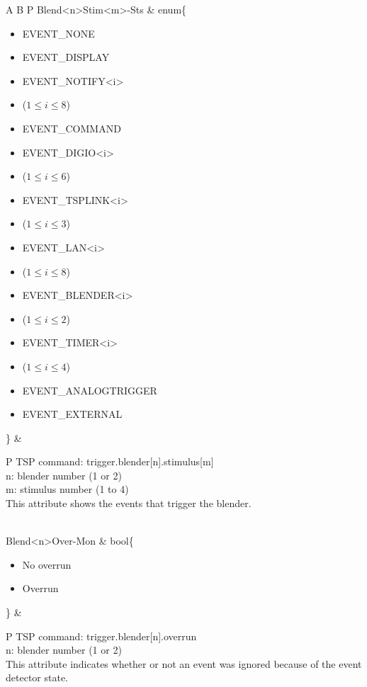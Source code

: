 \documentclass[openany]{article}
\begin{document}
\begin{longtable}{A B P}
		Blend{\textless n\textgreater}Stim{\textless m\textgreater}-Sts & enum\{\begin{itemize}[noitemsep]
					\small
					\item[] EVENT\_NONE
					\item[] EVENT\_DISPLAY
					\item[] EVENT\_NOTIFY\textless i\textgreater
					\item[] ($1\leq i\leq 8$)
					\item[] EVENT\_COMMAND
					\item[] EVENT\_DIGIO\textless i\textgreater
					\item[] ($1\leq i\leq 6$)
					\item[] EVENT\_TSPLINK\textless i\textgreater
					\item[] ($1\leq i\leq 3$)
					\item[] EVENT\_LAN\textless i\textgreater
					\item[] ($1\leq i\leq 8$)
					\item[] EVENT\_BLENDER\textless i\textgreater 
					\item[] ($1\leq i\leq 2$)
					\item[] EVENT\_TIMER\textless i\textgreater
					\item[] ($1\leq i\leq 4$)
					\item[] EVENT\_ANALOGTRIGGER
					\item[] EVENT\_EXTERNAL
				\end{itemize}\} & 
				\begin{tabular}{P}
					TSP command: trigger.blender[n].stimulus[m] \\
					n: blender number (1 or 2) \\
					m: stimulus number (1 to 4) \\
					This attribute shows the events that trigger the blender.
				\end{tabular} \\ \hline
		Blend{\textless n\textgreater}Over-Mon & bool\{\begin{itemize}[noitemsep]
					\small
					\item[] No overrun
					\item[] Overrun
				\end{itemize}\} & 
				\begin{tabular}{P}
					TSP command: trigger.blender[n].overrun \\
					n: blender number (1 or 2) \\
					This attribute indicates whether or not an event was ignored because of the event detector state.

\end{tabular}
\end{longtable}
\end{document}
